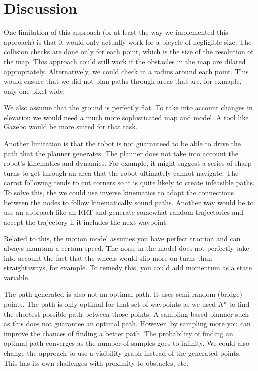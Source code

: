 \documentclass[12pt]{article}
\begin{document}
\section{Discussion}
\setlength{\parindent}{1cm}

One limitation of this approach (or at least the way we implemented this approach) is that it would only actually work for a bicycle of negligible size. The collision checks are done only for each point, which is the size of the resolution of the map. This approach could still work if the obstacles in the map are dilated appropriately. Alternatively, we could check in a radius around each point. This would ensure that we did not plan paths through areas that are, for exmaple, only one pixel wide.

We also assume that the ground is perfectly flat. To take into account changes in elevation we would need a much more sophisticated map and model. A tool like Gazebo would be more suited for that task.

Another limitation is that the robot is not guaranteed to be able to drive the path that the planner generates. The planner does not take into account the robot's kinematics and dynamics. For example, it might suggest a series of sharp turns to get through an area that the robot ultimately cannot navigate. The carrot following tends to cut corners so it is quite likely to create infeasible paths. To solve this, the we could use inverse kinematics to adapt the connections between the nodes to follow kinematically sound paths. Another way would be to use an approach like an RRT and generate somewhat random trajectories and accept the trajectory if it includes the next waypoint.  

Related to this, the motion model assumes you have perfect traction and can always maintain a certain speed. The noise in the model does not perfectly take into account the fact that the wheels would slip more on turns than straightaways, for example. To remedy this, you could add momentum as a state variable.

The path generated is also not an optimal path. It uses semi-random (bridge) points. The path is only optimal for that set of waypoints as we used A* to find the shortest possible path between those points. A sampling-based planner such as this does not guarantee an optimal path. However, by sampling more you can improve the chances of finding a better path. The probability of finding an optimal path converges as the number of samples goes to infinity. We could also change the approach to use a visibility graph instead of the generated points. This has its own challenges with proximity to obstacles, etc.  


 
\end{document}
